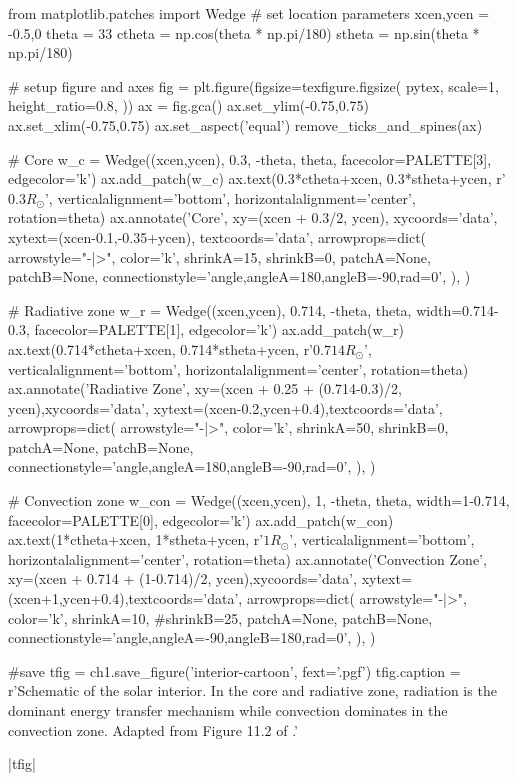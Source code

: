 \begin{pycode}[chapter1]
from matplotlib.patches import Wedge
# set location parameters
xcen,ycen = -0.5,0
theta = 33
ctheta = np.cos(theta * np.pi/180)
stheta = np.sin(theta * np.pi/180)

# setup figure and axes
fig = plt.figure(figsize=texfigure.figsize(
    pytex,
    scale=1,
    height_ratio=0.8,
))
ax = fig.gca()
ax.set_ylim(-0.75,0.75)
ax.set_xlim(-0.75,0.75)
ax.set_aspect('equal')
remove_ticks_and_spines(ax)

# Core
w_c = Wedge((xcen,ycen), 0.3, -theta, theta,
            facecolor=PALETTE[3], edgecolor='k')
ax.add_patch(w_c)
ax.text(0.3*ctheta+xcen, 0.3*stheta+ycen, r'$0.3R_\odot$',
        verticalalignment='bottom', horizontalalignment='center',
        rotation=theta)
ax.annotate('Core',
            xy=(xcen + 0.3/2, ycen), xycoords='data',
            xytext=(xcen-0.1,-0.35+ycen), textcoords='data',
            arrowprops=dict(
                arrowstyle="-|>",
                color='k',
                shrinkA=15, shrinkB=0,
                patchA=None,
                patchB=None,
                connectionstyle='angle,angleA=180,angleB=-90,rad=0',
            ),
)

# Radiative zone
w_r = Wedge((xcen,ycen), 0.714, -theta, theta,
            width=0.714-0.3,
            facecolor=PALETTE[1], edgecolor='k')
ax.add_patch(w_r)
ax.text(0.714*ctheta+xcen, 0.714*stheta+ycen,
        r'$0.714R_\odot$',
        verticalalignment='bottom', horizontalalignment='center',
        rotation=theta)
ax.annotate('Radiative Zone',
            xy=(xcen + 0.25 + (0.714-0.3)/2, ycen),xycoords='data',
            xytext=(xcen-0.2,ycen+0.4),textcoords='data',
            arrowprops=dict(
                arrowstyle="-|>",
                color='k',
                shrinkA=50, shrinkB=0,
                patchA=None,
                patchB=None,
                connectionstyle='angle,angleA=180,angleB=-90,rad=0',
            ),
)

# Convection zone
w_con = Wedge((xcen,ycen), 1, -theta, theta,
              width=1-0.714,
              facecolor=PALETTE[0], edgecolor='k')
ax.add_patch(w_con)
ax.text(1*ctheta+xcen, 1*stheta+ycen,
        r'$1R_\odot$',
        verticalalignment='bottom', horizontalalignment='center',
        rotation=theta)
ax.annotate('Convection Zone',
            xy=(xcen + 0.714 + (1-0.714)/2, ycen),xycoords='data',
            xytext=(xcen+1,ycen+0.4),textcoords='data',
            arrowprops=dict(
                arrowstyle="-|>",
                color='k',
                shrinkA=10, #shrinkB=25,
                patchA=None,
                patchB=None,
                connectionstyle='angle,angleA=-90,angleB=180,rad=0',
            ),
)

#save
tfig = ch1.save_figure('interior-cartoon', fext='.pgf')
tfig.caption = r'Schematic of the solar interior. In the core and radiative zone, radiation is the dominant energy transfer mechanism while convection dominates in the convection zone. Adapted from Figure 11.2 of \citet{carroll_introduction_2007}.'
\end{pycode}
\py[chapter1]|tfig|


